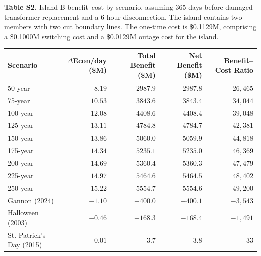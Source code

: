 \documentclass[draft]{agutexSI2019}
\begin{document}
\begin{center}
\textbf{Table S2.} Island B benefit--cost by scenario, assuming 365 days before damaged transformer replacement and a 6-hour disconnection. The island contains two members with two cut boundary lines. The one-time cost is \$0.1129M, comprising a \$0.1000M switching cost and a \$0.0129M outage cost for the island.\\[6pt]
\footnotesize
\begin{tabular}{lrrrr}
\hline
Scenario & $\Delta$Econ/day (\$M) & Total Benefit (\$M) & Net Benefit (\$M) & Benefit--Cost Ratio \\
\hline
50-year            & $8.19$  & $2987.9$ & $2987.8$ & $26{,}465$ \\
75-year            & $10.53$ & $3843.6$ & $3843.4$ & $34{,}044$ \\
100-year           & $12.08$ & $4408.6$ & $4408.4$ & $39{,}048$ \\
125-year           & $13.11$ & $4784.8$ & $4784.7$ & $42{,}381$ \\
150-year           & $13.86$ & $5060.0$ & $5059.9$ & $44{,}818$ \\
175-year           & $14.34$ & $5235.1$ & $5235.0$ & $46{,}369$ \\
200-year           & $14.69$ & $5360.4$ & $5360.3$ & $47{,}479$ \\
225-year           & $14.97$ & $5464.6$ & $5464.5$ & $48{,}402$ \\
250-year           & $15.22$ & $5554.7$ & $5554.6$ & $49{,}200$ \\
Gannon (2024)      & $-1.10$ & $-400.0$ & $-400.1$ & $-3{,}543$ \\
Halloween (2003)   & $-0.46$ & $-168.3$ & $-168.4$ & $-1{,}491$ \\
St. Patrick's Day (2015) & $-0.01$ & $-3.7$ & $-3.8$ & $-33$ \\
\hline
\end{tabular}
\end{center}

\vspace{18pt}
\end{document}
